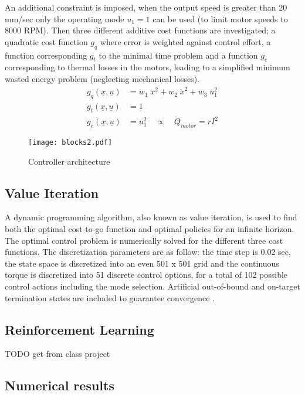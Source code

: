 An additional constraint is imposed, when the output speed is greater than 20 mm/sec only the operating mode $u_1=1$ can be used (to limit motor speeds to 8000 RPM). Then three different additive cost functions are investigated; a quadratic cost function $g_q$ where error is weighted against control effort, a function corresponding $g_t$ to the minimal time problem and a function $g_e$ corresponding to thermal losses in the motors, leading to a simplified minimum wasted energy problem (neglecting mechanical losses).
%
\begin{align}
	g_q(\underline{x},\underline{u}) &= w_1 \; x^2 + w_2 \; \dot{x}^2 + w_3 \; u_1^2
	\label{eq:g_quad} \\
	g_t(\underline{x},\underline{u}) &= 1
	\label{eq:g_time} \\
	g_e(\underline{x},\underline{u}) &= u_1^2 \quad  \propto \quad  \dot{Q}_{motor} = r I^2
	\label{eq:g_e}
\end{align}
%

\begin{figure}[H]
	\centering
		\texttt{[image: blocks2.pdf]}
	\caption{Controller architecture}
	\label{fig:blocks}
\end{figure}


\subsection{Value Iteration}
\label{sec:VI}

A dynamic programming algorithm, also known as value iteration, is used to find both the optimal cost-to-go function and optimal policies for an infinite horizon. The optimal control problem is numerically solved for the different three cost functions. The discretization parameters are as follow: the time step is 0.02 sec, the state space is discretized into an even 501 x 501 grid and the continuous torque is discretized into 51 discrete control options, for a total of 102 possible control actions including the mode selection. Artificial out-of-bound and on-target termination states are included to guarantee convergence \cite{DP}.

\subsection{Reinforcement Learning}

TODO get from class project


\subsection{Numerical results}

